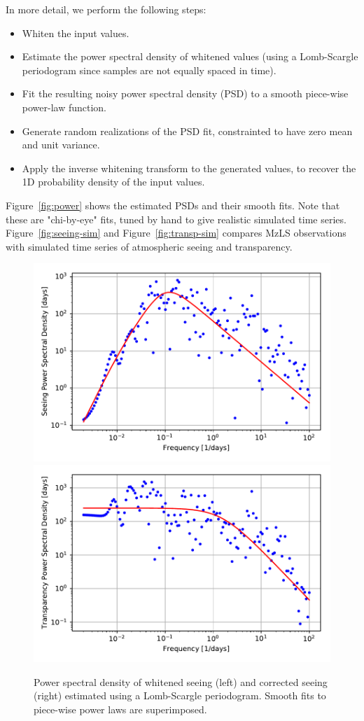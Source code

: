\documentclass[12pt]{article}
\providecommand{\fig}[1]{Figure~\ref{fig:#1}}
\begin{document}
In more detail, we perform the following steps:
\begin{itemize}
    \item Whiten the input values.
    \item Estimate the power spectral density of whitened values (using a Lomb-Scargle periodogram since samples are not equally spaced in time).
    \item Fit the resulting noisy power spectral density (PSD) to a smooth piece-wise power-law function.
    \item Generate random realizations of the PSD fit, constrainted to have zero mean and unit variance.
    \item Apply the inverse whitening transform to the generated values, to recover the 1D probability density of the input values.
\end{itemize}
\fig{power} shows the estimated PSDs and their smooth fits. Note that these are "chi-by-eye" fits, tuned by hand to give realistic simulated time series.  \fig{seeing-sim} and \fig{transp-sim} compares MzLS observations with simulated time series of atmospheric seeing and transparency.

\begin{figure}[htb]
\begin{center}
\includegraphics[width=0.48\linewidth]{seeing-psd}
\includegraphics[width=0.48\linewidth]{transp-psd}
\caption{Power spectral density of whitened seeing (left) and corrected seeing (right) estimated using a Lomb-Scargle periodogram.  Smooth fits to piece-wise power laws are superimposed.}
\label{fig:transp-model}
\end{center}
\end{figure}
\end{document}
